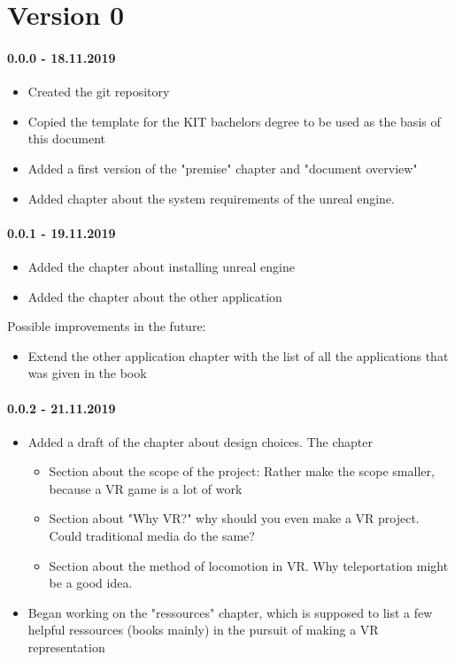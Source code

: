 
\section*{Version 0}

\paragraph{0.0.0 - 18.11.2019}

\begin{itemize}
\item Created the git repository
\item Copied the template for the KIT bachelors degree to be used as the basis of this document
\item Added a first version of the "premise" chapter and "document overview"
\item Added chapter about the system requirements of the unreal engine.
\end{itemize}

\paragraph{0.0.1 - 19.11.2019}

\begin{itemize}
\item Added the chapter about installing unreal engine
\item Added the chapter about the other application
\end{itemize}

Possible improvements in the future:

\begin{itemize}
\item Extend the other application chapter with the list of all the applications that was given in the book
\end{itemize}

\paragraph{0.0.2 - 21.11.2019} 

\begin{itemize}
\item Added a draft of the chapter about design choices. The chapter
\begin{itemize}
\item Section about the scope of the project: Rather make the scope smaller, because a VR game is a lot of work
\item Section about "Why VR?" why should you even make a VR project. Could traditional media do the same?
\item Section about the method of locomotion in VR. Why teleportation might be a good idea.
\end{itemize}
\item Began working on the "ressources" chapter, which is supposed to list a few helpful ressources (books mainly) in the pursuit of making a VR representation
\end{itemize}

